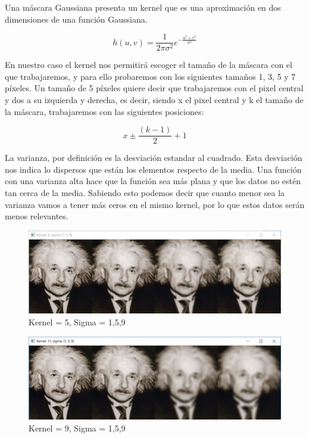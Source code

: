 \documentclass{article}
\begin{document}
Una máscara Gaussiana presenta un kernel que es una aproximación en dos dimensiones de una función Gaussiana.

\begin{equation}
h(u,v) = \frac{1}{2\pi\sigma^2}e^{-\frac{u^2+v^2}{\sigma^2}}
\end{equation}

En nuestro caso el kernel nos permitirá escoger el tamaño de la máscara con el que trabajaremos, y para ello probaremos con los siguientes tamaños 1, 3, 5 y 7 píxeles.  Un tamaño de 5 píxeles quiere decir que trabajaremos con el pixel central y dos a su izquierda y derecha, es decir, siendo x el pixel central y k el tamaño de la máscara, trabajaremos con las siguientes posiciones:

\begin{equation}
x\pm\frac{(k-1)}{2}+1
\end{equation}

La varianza, por definición es la desviación estandar al cuadrado. Esta desviación nos indica lo dispersos que están los elementos respecto de la media. Una función con una varianza alta hace que la función sea más plana y que los datos no estén tan cerca de la media. Sabiendo esto podemos decir que cuanto menor sea la varianza vamos a tener más ceros en el mismo kernel, por lo que estos datos serán menos relevantes.


\begin{figure}[h]

\centering
\includegraphics[scale=0.58]{1a1.PNG}
\caption{Kernel = 5, Sigma = 1,5,9}

\end{figure}

\begin{figure}[h]

\centering
\includegraphics[scale=0.58]{1a2.PNG}
\caption{Kernel = 9, Sigma = 1,5,9}
\end{figure}
\end{document}
